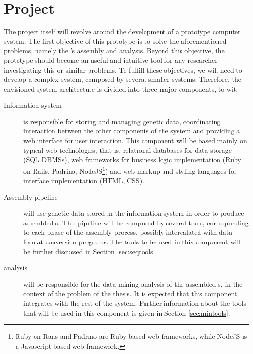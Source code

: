 \section{Project} \label{sec:project}

The project itself will revolve around the development of a prototype computer
system. The first objective of this prototype is to solve the aforementioned
problems, namely the \trans 's assembly and analysis. Beyond this objective, the
prototype should become an useful and intuitive tool for any researcher
investigating this or similar problems. To fulfill these objectives, we will
need to develop a complex system, composed by several smaller systems.
Therefore, the envisioned system architecture is divided into three major
components, to wit:

\begin{description}

  \item[Information system]
  is responsible for storing and managing genetic data, coordinating interaction
  between the other components of the system and providing a web interface for
  user interaction. This component will be based mainly on typical web
  technologies, that is, relational databases for data storage (SQL DBMSs), web
  frameworks for business logic implementation (Ruby on Rails, Padrino,
  NodeJS\footnote{Ruby on Rails and Padrino are Ruby based web frameworks, while
  NodeJS is a Javascript based web framework.}) and web markup and styling
  languages for interface implementation (HTML, CSS).

  \item[Assembly pipeline]
  will use genetic data stored in the information system in order to produce
  assembled \trans s. This pipeline will be composed by several tools,
  corresponding to each phase of the assembly process, possibly intercalated
  with data format conversion programs. The tools to be used in this component
  will be further discussed in Section \ref{sec:seqtools}.

  \item[\Trans{} analysis]
  will be responsible for the data mining analysis of the assembled \trans s, in
  the context of the problem of the thesis. It is expected that this component
  integrates with the rest of the system. Further information about the tools
  that will be used in this component is given in Section \ref{sec:mintools}.

\end{description}

